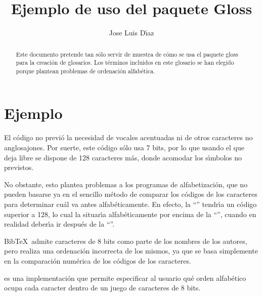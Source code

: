 \documentclass[a4paper,spanish]{article}
\title{Ejemplo de uso del paquete \textsf{Gloss}}
\author{Jose Luis D\'{\i}az}
\begin{document}
\maketitle
\begin{abstract}
  Este documento pretende tan s\'olo servir de muestra de c\'omo se usa el
  paquete \textsf{gloss} para la creaci\'on de glosarios. Los t\'erminos
  incluidos en este glosario se han elegido porque plantean problemas
  de ordenaci\'on alfab\'etica.
\end{abstract}

\section{Ejemplo}

El c\'odigo  no previ\'o la  necesidad de vocales acentuadas
ni de otros caracteres no anglosajones. Por suerte, este c\'odigo s\'olo
usa 7 bits, por lo que usando el  que deja
libre se dispone de 128 caracteres m\'as, donde acomodar los s\'{\i}mbolos no
previstos.

No obstante, esto plantea problemas a los programas de alfabetizaci\'on,
que no pueden basarse ya en el sencillo m\'etodo de comparar los c\'odigos
de los caracteres para determinar cu\'al va antes alfab\'eticamente. En
efecto, la ``'' tendr\'{\i}a un c\'odigo superior a 128, lo cual
la situar\'{\i}a alfab\'eticamente por encima de la ``'', cuando
en realidad deber\'{\i}a ir despu\'es de la ``''.

Bib\TeX\ admite caracteres de 8 bits como parte de los nombres de los
autores, pero realiza una ordenaci\'on incorrecta de los mismos, ya que
se basa simplemente en la comparaci\'on num\'erica de los c\'odigos de los
caracteres.

 es una implementaci\'on que permite especificar al
usuario qu\'e orden alfab\'etico ocupa cada caracter dentro de un juego de
caracteres de 8 bits.

\end{document}
